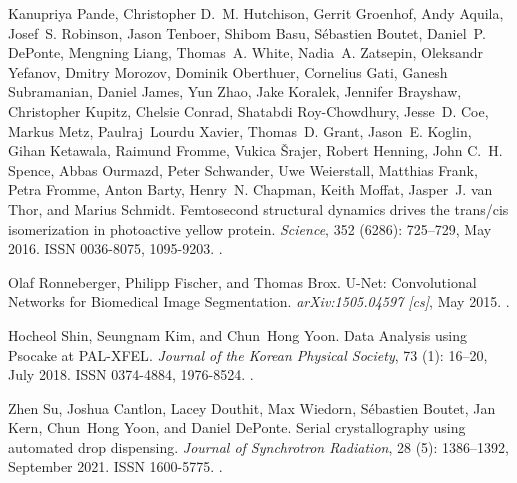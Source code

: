 \documentclass[a4paper]{article}
\begin{document}
\begin{thebibliography}{33}
Kanupriya Pande, Christopher D.~M. Hutchison, Gerrit Groenhof, Andy Aquila,
  Josef~S. Robinson, Jason Tenboer, Shibom Basu, S{\'e}bastien Boutet,
  Daniel~P. DePonte, Mengning Liang, Thomas~A. White, Nadia~A. Zatsepin,
  Oleksandr Yefanov, Dmitry Morozov, Dominik Oberthuer, Cornelius Gati, Ganesh
  Subramanian, Daniel James, Yun Zhao, Jake Koralek, Jennifer Brayshaw,
  Christopher Kupitz, Chelsie Conrad, Shatabdi {Roy-Chowdhury}, Jesse~D. Coe,
  Markus Metz, Paulraj~Lourdu Xavier, Thomas~D. Grant, Jason~E. Koglin, Gihan
  Ketawala, Raimund Fromme, Vukica {\v S}rajer, Robert Henning, John C.~H.
  Spence, Abbas Ourmazd, Peter Schwander, Uwe Weierstall, Matthias Frank, Petra
  Fromme, Anton Barty, Henry~N. Chapman, Keith Moffat, Jasper~J. {van Thor},
  and Marius Schmidt.
\newblock Femtosecond structural dynamics drives the trans/cis isomerization in
  photoactive yellow protein.
\newblock \emph{Science}, 352 (6286): 725--729, May 2016.
\newblock ISSN 0036-8075, 1095-9203.
\newblock {}.

Olaf Ronneberger, Philipp Fischer, and Thomas Brox.
\newblock U-{{Net}}: {{Convolutional Networks}} for {{Biomedical Image
  Segmentation}}.
\newblock \emph{arXiv:1505.04597 [cs]}, May 2015.
\newblock {}.

Hocheol Shin, Seungnam Kim, and Chun~Hong Yoon.
\newblock Data {{Analysis}} using {{Psocake}} at {{PAL-XFEL}}.
\newblock \emph{Journal of the Korean Physical Society}, 73
  (1): 16--20, July 2018.
\newblock ISSN 0374-4884, 1976-8524.
\newblock {}.

Zhen Su, Joshua Cantlon, Lacey Douthit, Max Wiedorn, S{\'e}bastien Boutet, Jan
  Kern, Chun~Hong Yoon, and Daniel DePonte.
\newblock Serial crystallography using automated drop dispensing.
\newblock \emph{Journal of Synchrotron Radiation}, 28 (5):
  1386--1392, September 2021.
\newblock ISSN 1600-5775.
\newblock {}.


\end{thebibliography}
\end{document}
